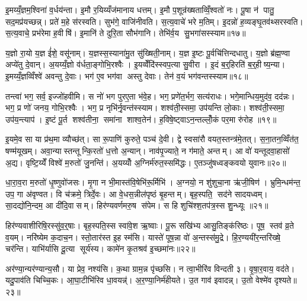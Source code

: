इ॒मय्यँ॒ज्ञम॒श्विना॑ व॒र्धय॑न्ता। इ॒मौ र॒यिय्यँज॑मानाय धत्तम्। इ॒मौ प॒शून्र॑ख्षताव्विँ॒श्वतो॑ नः। पू॒षा न॑ पातु॒ सद॒मप्र॑यच्छन्न्। प्रते॑ म॒हे स॑रस्वति। सुभ॑गे॒ वाजि॑नीवति। स॒त्य॒वाचे॑ भरे म॒तिम्। इ॒दन्नो॑ ह॒व्यङ्घृ॒तव॑थ्सरस्वति। स॒त्य॒वाचे॒ प्रभ॑रेमा ह॒वीषि॑। इ॒मानि॑ ते दुरि॒ता सौभ॑गानि। तेभि॑र्व॒य सु॒भगा॑सस्स्याम॥१७॥\anuvakamend[व॒ज्र्यही॑नामृजी॒षं व्यृ॑ण्वति रख्षतु नो र॒यि सौभ॑गा॒न्येक॑ञ्च]

य॒ज्ञो रा॒यो य॒ज्ञ ई॑शे॒ वसू॑नाम्। य॒ज्ञस्स॒स्याना॑मु॒त सु॑ख्षिती॒नाम्। य॒ज्ञ इ॒ष्टः पू॒र्वचि॑त्तिन्दधातु। य॒ज्ञो ब्र॑ह्म॒ण्वा अप्ये॑तु दे॒वान्। अ॒यय्यँ॒ज्ञो व॑र्धता॒ङ्गोभि॒रश्वैः। इ॒यव्वेँदि॑स्स्वप॒त्या सु॒वीरा। इ॒दं ब॒र्॒हिरति॑ ब॒र्॒हीष्य॒न्या। इ॒मय्यँ॒ज्ञव्विँश्वे॑ अवन्तु दे॒वाः। भग॑ ए॒व भग॑वा अस्तु देवाः। तेन॑ व॒यं भग॑वन्तस्स्याम॥१८॥

तन्त्वा॑ भग॒ सर्व॒ इज्जो॑हवीमि। स नो॑ भग पुरए॒ता भ॑वे॒ह। भग॒ प्रणे॑त॒र्भग॒ सत्य॑राधः। भगे॒मान्धिय॒मुद॑व॒ दद॑न्नः। भग॒ प्र णो॑ जनय॒ गोभि॒रश्वैः। भग॒ प्र नृभि॑र्नृ॒वन्त॑स्स्याम। शश्व॑ती॒स्समा॒ उप॑यन्ति लो॒काः। शश्व॑ती॒स्समा॒ उप॑य॒न्त्याप॑। इ॒ष्टं पू॒र्त शश्व॑तीना॒ समा॑ना शाश्व॒तेन॑। ह॒विषे॒ष्ट्वाऽन॒न्तल्लोँ॒कं पर॒मा रु॑रोह ॥१९॥

इ॒यमे॒व सा या प्र॑थ॒मा व्यौच्छ॑त्। सा रू॒पाणि॑ कुरुते॒ पञ्च॑ दे॒वी। द्वे स्वसा॑रौ वयत॒स्तन्त्र॑मे॒तत्। स॒ना॒तन॒व्विँत॑त॒ षण्म॑यूखम्। अवा॒न्यास्तन्तून्कि॒रतो॑ ध॒त्तो अ॒न्यान्। नाव॑पृ॒ज्याते॒ न ग॑माते॒ अन्तम्। आ वो॑ यन्तूदवा॒हासो॑ अ॒द्य। वृष्टि॒य्येँ विश्वे॑ म॒रुतो॑ जु॒नन्ति॑। अ॒यय्योँ अ॒ग्निर्म॑रुत॒स्समि॑द्धः। ए॒तञ्जु॑षध्वङ्कवयो युवानः॥२०॥

धा॒रा॒व॒रा म॒रुतो॑ धृ॒ष्णुवो॑जसः। मृ॒गा न भी॒मास्त॑वि॒षेभि॑रू॒र्मिभि॑। अ॒ग्नयो॒ न शु॑शुचा॒ना ऋ॑जी॒षिण॑। भ्रुमि॒न्धम॑न्त॒ उप॒ गा अ॑वृण्वत। वि च॑क्रमे॒ त्रिर्दे॒वः। आ वे॒धस॒न्नील॑पृष्ठं बृ॒हन्तम्। बृह॒स्पति॒ सद॑ने सादयध्वम्। सा॒दद्यो॑नि॒न्दम॒ आ दी॑दि॒वासम्। हिर॑ण्यवर्णमरु॒ष स॑पेम। स हि शुचि॑श्श॒तप॑त्र॒स्स शु॒न्ध्यूः ॥२१॥

हिर॑ण्यवाशीरिषि॒रस्सु॑व॒र्॒षाः। बृह॒स्पति॒स्स स्वा॑वे॒श ऋ॒ष्वाः। पू॒रू सखि॑भ्य आसु॒तिङ्क॑रिष्ठः। पूष॒ स्तव॑ व्र॒ते व॒यम्। नरि॑ष्येम क॒दाच॒न। स्तो॒तार॑स्त इ॒ह स्म॑सि। यास्ते॑ पूष॒न्ना वो॑ अ॒न्तस्स॑मु॒द्रे। हि॒र॒ण्ययी॑र॒न्तरि॑ख्षे॒ चर॑न्ति। याभि॑र्यासि दू॒त्या सूर्य॑स्य। कामे॑न कृ॒तश्रव॑ इ॒च्छमा॑नः॥२२॥

अर॑ण्या॒न्यर॑ण्यान्य॒सौ। या प्रेव॒ नश्य॑सि। क॒था ग्राम॒न्न पृ॑च्छसि। न त्वा॒भीरि॑व विन्दती ३। वृ॒षा॒र॒वाय॒ वद॑ते। यदु॒पाव॑ति चिच्चि॒कः। आ॒घा॒टीभि॑रिव धा॒वयन्न्॑। अ॒र॒ण्या॒निर्म॑हीयते। उ॒त गाव॑ इवादन्न्। उ॒तो वेश्मे॑व दृश्यते॥२३॥


